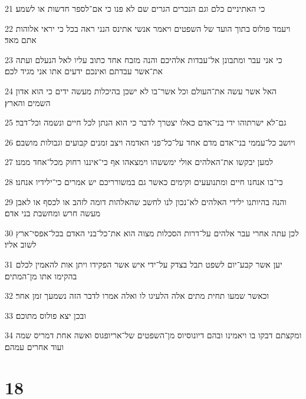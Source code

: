 \par 21 כי האתיניים כלם וגם הנכרים הגרים שם לא פנו כי אם־לספר חדשות או לשמע׃
\par 22 ויעמד פולוס בתוך הועד של השפטים ויאמר אנשי אתינס הנני ראה בכל כי יראי אלוהות אתם מאד׃
\par 23 כי אני עבר ומתבונן אל־עבדות אלהיכם והנה מזבח אחד כתוב עליו לאל הנעלם ועתה את־אשר עבדתם ואינכם ידעים אתו אני מגיד לכם׃
\par 24 האל אשר עשה את־העולם וכל אשר־בו לא ישכן בהיכלות מעשה ידים כי הוא אדון השמים והארץ׃
\par 25 גם־לא ישרתוהו ידי בני־אדם כאלו יצטרך לדבר כי הוא הנתן לכל חיים ונשמה וכל־דבר׃
\par 26 ויושב כל־עממי בני־אדם מדם אחד על־כל־פני האדמה ויצב זמנים קבועים וגבולות מושבם׃
\par 27 למען יבקשו את־האלהים אולי ימששהו וימצאהו אף כי־איננו רחוק מכל־אחד ממנו׃
\par 28 כי־בו אנחנו חיים ומתנועעים וקימים כאשר גם במשורריכם יש אמרים כי־ילידיו אנחנו׃
\par 29 והנה בהיותנו ילידי האלהים לא־נכון לנו לחשב שהאלהות דומה לזהב או לכסף או לאבן מעשה חרש ומחשבת בני אדם׃
\par 30 לכן עתה אחרי עבר אלהים על־דרות הסכלות מצוה הוא את־כל־בני האדם בכל־אפסי־ארץ לשוב אליו׃
\par 31 יען אשר קבע־יום לשפט תבל בצדק על־ידי איש אשר הפקידו ויתן אות להאמין לכלם בהקימו אתו מן־המתים׃
\par 32 וכאשר שמעו תחית מתים אלה הלעיגו לו ואלה אמרו לדבר הזה נשמעך זמן אחר׃
\par 33 ובכן יצא פולוס מתוכם׃
\par 34 ומקצתם דבקו בו ויאמינו ובהם דיונוסיוס מן־השפטים של־אריופגוס ואשה אחת דמריס שמה ועוד אחרים עמהם׃

\chapter{18}

